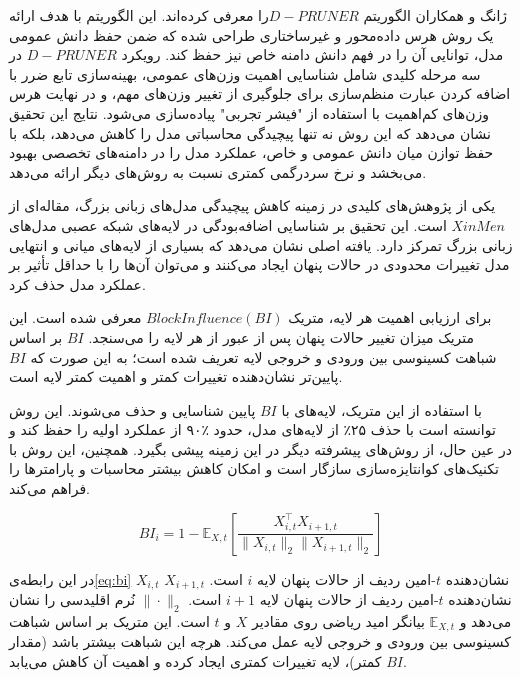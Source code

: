  ژانگ و همکاران  الگوریتم $D-PRUNER $را معرفی کرده‌اند. این الگوریتم با هدف ارائه یک روش هرس داده‌محور و غیرساختاری طراحی شده که ضمن حفظ دانش عمومی مدل، توانایی آن را در فهم دانش دامنه خاص نیز حفظ کند. رویکرد $D-PRUNER$ در سه مرحله کلیدی شامل شناسایی اهمیت وزن‌های عمومی، بهینه‌سازی تابع ضرر با اضافه کردن  عبارت منظم‌سازی      برای جلوگیری از تغییر وزن‌های مهم، و در نهایت هرس وزن‌های کم‌اهمیت با استفاده از "فیشر تجربی" پیاده‌سازی می‌شود. نتایج این تحقیق نشان می‌دهد که این روش نه تنها پیچیدگی محاسباتی مدل را کاهش می‌دهد، بلکه با حفظ توازن میان دانش عمومی و خاص، عملکرد مدل را در دامنه‌های تخصصی بهبود می‌بخشد و نرخ سردرگمی  کمتری نسبت به روش‌های دیگر ارائه می‌دهد\cite{zhang2024pruning}.

یکی از پژوهش‌های کلیدی در زمینه کاهش پیچیدگی مدل‌های زبانی بزرگ، مقاله‌ای از $Xin Men$ است. این تحقیق بر شناسایی  اضافه‌بودگی   در لایه‌های شبکه عصبی مدل‌های زبانی بزرگ تمرکز دارد. یافته اصلی نشان می‌دهد که بسیاری از لایه‌های میانی و انتهایی مدل تغییرات محدودی در حالات پنهان ایجاد می‌کنند و می‌توان آن‌ها را با حداقل تأثیر بر عملکرد مدل حذف کرد.

برای ارزیابی اهمیت هر لایه، متریک $Block Influence (BI)$ معرفی شده است. این متریک میزان تغییر حالات پنهان پس از عبور از هر لایه را می‌سنجد. $BI$ بر اساس شباهت کسینوسی بین ورودی و خروجی لایه تعریف شده است؛ به این صورت که $BI$ پایین‌تر نشان‌دهنده تغییرات کمتر و اهمیت کمتر لایه است.

با استفاده از این متریک، لایه‌های با $BI$ پایین شناسایی و حذف می‌شوند. این روش توانسته است با حذف ۲۵٪ از لایه‌های مدل، حدود ٪۹۰ از عملکرد اولیه را حفظ کند و در عین حال، از روش‌های پیشرفته دیگر در این زمینه پیشی بگیرد. همچنین، این روش با تکنیک‌های کوانتایزه‌سازی سازگار است و امکان کاهش بیشتر محاسبات و پارامترها را فراهم می‌کند.

\begin{equation}
	BI_i = 1 - \mathbb{E}_{X, t} \left[ \frac{X_{i,t}^\top X_{i+1,t}}{\|X_{i,t}\|_2 \|X_{i+1,t}\|_2} \right]
	\label{eq:bi}
\end{equation}

در این رابطه‌ی\ref{eq:bi} \( X_{i,t} \) نشان‌دهنده \( t \)-امین ردیف از حالات پنهان لایه \( i \) است. \( X_{i+1,t} \) نشان‌دهنده \( t \)-امین ردیف از حالات پنهان لایه \( i+1 \) است. \( \|\cdot\|_2 \) نُرم اقلیدسی را نشان می‌دهد و \( \mathbb{E}_{X, t} \) بیانگر امید ریاضی روی مقادیر \( X \) و \( t \) است. این متریک بر اساس شباهت کسینوسی بین ورودی و خروجی لایه عمل می‌کند. هرچه این شباهت بیشتر باشد (مقدار \( BI \) کمتر)، لایه تغییرات کمتری ایجاد کرده و اهمیت آن کاهش می‌یابد.


